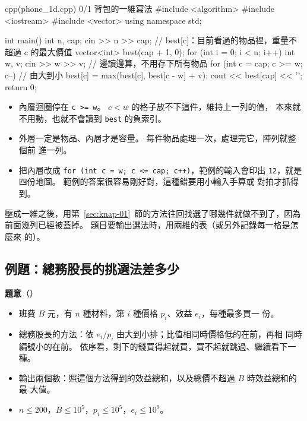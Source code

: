 \begin{example}[label=ex:knap-1d]{cpp}{(phone\_1d.cpp) 0/1 背包的一維寫法}
#include <algorithm>
#include <iostream>
#include <vector>
using namespace std;

int main() {
    int n, cap;
    cin >> n >> cap;
    // best[c]：目前看過的物品裡，重量不超過 c 的最大價值
    vector<int> best(cap + 1, 0);
    for (int i = 0; i < n; i++) {
        int w, v;
        cin >> w >> v;              // 邊讀邊算，不用存下所有物品
        for (int c = cap; c >= w; c--) {          // 由大到小
            best[c] = max(best[c], best[c - w] + v);
        }
    }
    cout << best[cap] << '\n';
    return 0;
}
\end{example}


\begin{itemize}
\item 內層迴圈停在 \texttt{c >= w}。 $c < w$ 的格子放不下這件，維持上一列的值，
本來就不用動，也就不會讀到 \texttt{best} 的負索引。
\item 外層一定是物品、內層才是容量。 每件物品處理一次，處理完它，陣列就整個前
進一列。
\item 把內層改成 \texttt{for (int c = w; c <= cap; c++)}，範例的輸入會印出
\texttt{12}，就是四份地圖。 範例的答案很容易剛好對，這種錯要用小輸入手算或
對拍才抓得到。
\end{itemize}

壓成一維之後，用第~\ref{sec:knap-01}~節的方法往回找選了哪幾件就做不到了，因為
前面幾列已經被蓋掉。 題目要輸出選法時，用兩維的表（或另外記錄每一格是怎麼來
的）。

\subsection{例題：總務股長的挑選法差多少}
\label{sec:ex-treasurer}

\textbf{題意}（）

\begin{itemize}
\item 班費 $B$ 元，有 $n$ 種材料，第 $i$ 種價格 $p_i$、效益 $e_i$，每種最多買一
份。
\item 總務股長的方法：依 $e_i / p_i$ 由大到小排；比值相同時價格低的在前，再相
同時編號小的在前。 依序看，剩下的錢買得起就買，買不起就跳過、繼續看下一種。
\item 輸出兩個數：照這個方法得到的效益總和，以及總價不超過 $B$ 時效益總和的最
大值。
\item $n \le 200$，$B \le 10^5$，$p_i \le 10^5$，$e_i \le 10^9$。
\end{itemize}

